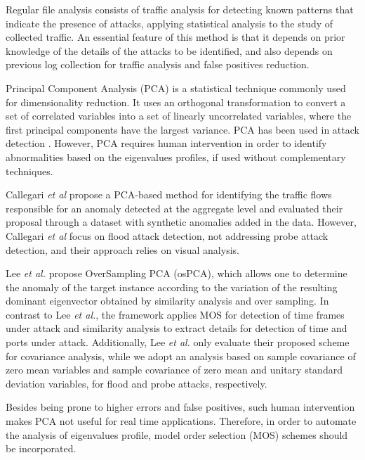 \documentclass[review]{elsarticle}
\begin{document}
Regular file analysis \cite{raynal2004honeypot} consists of traffic analysis for detecting known patterns that indicate the presence of attacks, applying statistical analysis to the study of collected traffic. An essential feature of this method is that it depends on prior knowledge of the details of the attacks to be identified, and also depends on previous log collection for traffic analysis and false positives reduction.

Principal Component Analysis (PCA) is a statistical technique commonly used for dimensionality reduction. It uses an orthogonal transformation to convert a set of correlated variables into a set of linearly uncorrelated variables, where the first principal components have the largest variance. PCA has been used in attack detection \cite{almotairi2009technique}. However, PCA requires human intervention in order to identify abnormalities based on the eigenvalues profiles, if used without complementary techniques.

Callegari \emph{et al} \cite{Zonglin2009} propose a PCA-based method for identifying the traffic flows responsible for an anomaly detected at the aggregate level and evaluated their proposal through a dataset with synthetic anomalies added in the data. However, Callegari \emph{et al} focus on flood attack detection, not addressing probe attack detection, and their approach relies on visual analysis. 

Lee \emph{et al.} \cite{Lee2013} propose OverSampling PCA (osPCA), which allows one to determine the anomaly of the target instance according to the variation of the resulting dominant eigenvector obtained by similarity analysis and over sampling. In contrast to Lee \emph{et al.}, the framework applies MOS for detection of time frames under attack and similarity analysis to extract details for detection of time and ports under attack. Additionally, Lee \emph{et al.} only evaluate their proposed scheme for covariance analysis, while we adopt an analysis based on sample covariance of zero mean variables and sample covariance of zero mean and unitary standard deviation variables, for flood and probe attacks, respectively. 

Besides being prone to higher errors and false positives, such human intervention makes PCA not useful for real time applications. Therefore, in order to automate the analysis of eigenvalues profile, model order selection (MOS) schemes should be incorporated.
\end{document}
